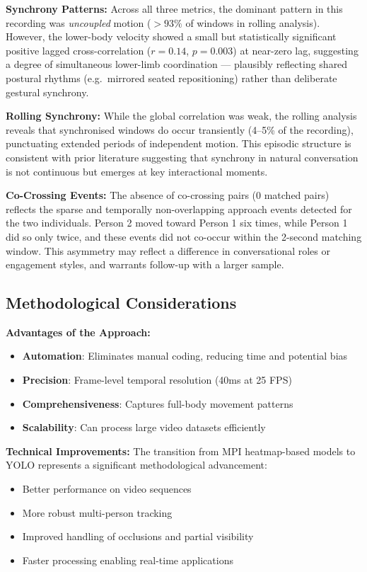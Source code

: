 \documentclass[11pt]{article}
\begin{document}
\textbf{Synchrony Patterns:}
Across all three metrics, the dominant pattern in this recording was \textit{uncoupled} motion ($>93\%$ of windows in rolling analysis). However, the lower-body velocity showed a small but statistically significant positive lagged cross-correlation ($r = 0.14$, $p = 0.003$) at near-zero lag, suggesting a degree of simultaneous lower-limb coordination — plausibly reflecting shared postural rhythms (e.g.\ mirrored seated repositioning) rather than deliberate gestural synchrony.

\textbf{Rolling Synchrony:}
While the global correlation was weak, the rolling analysis reveals that synchronised windows do occur transiently (4--5\% of the recording), punctuating extended periods of independent motion. This episodic structure is consistent with prior literature suggesting that synchrony in natural conversation is not continuous but emerges at key interactional moments.

\textbf{Co-Crossing Events:}
The absence of co-crossing pairs (0 matched pairs) reflects the sparse and temporally non-overlapping approach events detected for the two individuals. Person 2 moved toward Person 1 six times, while Person 1 did so only twice, and these events did not co-occur within the 2-second matching window. This asymmetry may reflect a difference in conversational roles or engagement styles, and warrants follow-up with a larger sample.

\subsection{Methodological Considerations}

\textbf{Advantages of the Approach:}
\begin{itemize}
    \item \textbf{Automation}: Eliminates manual coding, reducing time and potential bias
    \item \textbf{Precision}: Frame-level temporal resolution (40ms at 25 FPS)
    \item \textbf{Comprehensiveness}: Captures full-body movement patterns
    \item \textbf{Scalability}: Can process large video datasets efficiently
\end{itemize}

\textbf{Technical Improvements:}
The transition from MPI heatmap-based models to YOLO represents a significant methodological advancement:
\begin{itemize}
    \item Better performance on video sequences
    \item More robust multi-person tracking
    \item Improved handling of occlusions and partial visibility
    \item Faster processing enabling real-time applications
\end{itemize}
\end{document}
